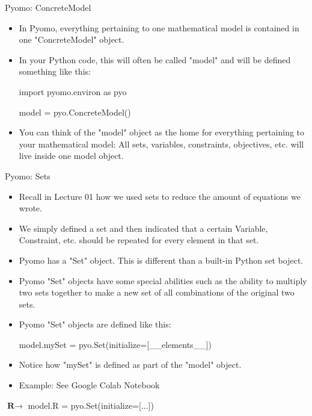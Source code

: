\documentclass[10pt, aspectratio=169]{beamer}
\begin{document}
\begin{frame}{Pyomo: ConcreteModel}
    \begin{itemize}
        \item In Pyomo, everything pertaining to one mathematical model is contained in one "ConcreteModel" object.
        \item In your Python code, this will often be called "model" and will be defined something like this:
        
        \hspace{0.25cm} import pyomo.environ as pyo

        \vspace{0.25cm}
        
        \hspace{0.25cm} model = pyo.ConcreteModel()

        \item You can think of the "model" object as the home for everything pertaining to your mathematical model: All sets, variables, constraints, objectives, etc. will live inside one model object.
    \end{itemize}
\end{frame}

\begin{frame}{Pyomo: Sets}
    \begin{itemize}
        \item Recall in Lecture 01 how we used sets to reduce the amount of equations we wrote.
        \item We simply defined a set and then indicated that a certain Variable, Constraint, etc. should be repeated for every element in that set.
        \item Pyomo has a "Set" object. This is different than a built-in Python set boject.
        \item Pyomo "Set" objects have some special abilities such as the ability to multiply two sets together to make a new set of all combinations of the original two sets.
        \item Pyomo "Set" objects are defined like this:
        
        \hspace{0.25cm} model.mySet = pyo.Set(initialize=[\_\_elements\_\_])

        \item Notice how "mySet" is defined as part of the "model" object.
        \item Example: See Google Colab Notebook
    \end{itemize}

    \begin{center}
        $\textbf{R} \rightarrow $ model.R = pyo.Set(initialize=[...])
    \end{center}
\end{frame}
\end{document}

